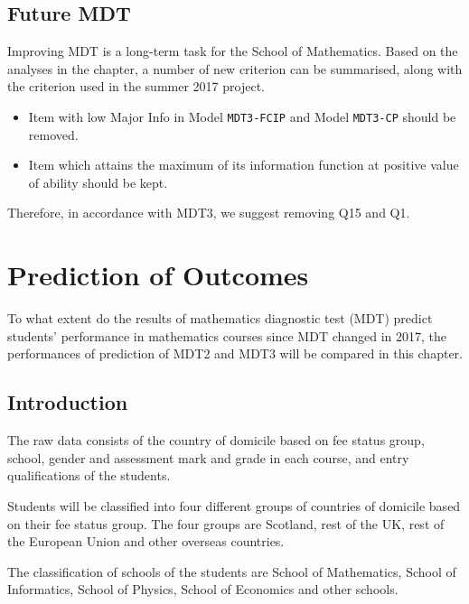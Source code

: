 \documentclass[a4paper]{report}
\begin{document}
\section{Future MDT}

Improving MDT is a long-term task for the School of Mathematics. Based on the analyses in the chapter, a number of new criterion can be summarised, along with the criterion used in the summer 2017 project. 

\begin{itemize}
\item Item with low Major Info in Model \texttt{MDT3-FCIP} and Model \texttt{MDT3-CP} should be removed. 
\item Item which attains the maximum of its information function at positive value of ability should be kept. 
\end{itemize}

Therefore, in accordance with MDT3, we suggest removing Q15 and Q1. 


\chapter{Prediction of Outcomes}

To what extent do the results of mathematics diagnostic test (MDT) predict students' performance in mathematics courses since MDT changed in 2017, the performances of prediction of MDT2 and MDT3 will be compared in this chapter. 


\section{Introduction}

The raw data consists of the country of domicile based on fee status group, school, gender and assessment mark and grade in each course, and entry qualifications of the students. 

Students will be classified into four different groups of countries of domicile based on their fee status group. The four groups are Scotland, rest of the UK, rest of the European Union and other overseas countries. 

The classification of schools of the students are School of Mathematics, School of Informatics, School of Physics, School of Economics and other schools. 
\end{document}
